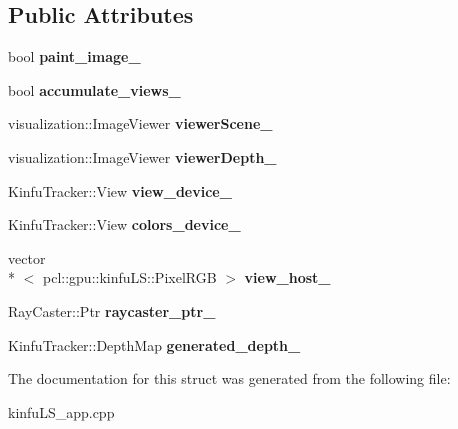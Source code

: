 \subsection*{Public Attributes}
\begin{DoxyCompactItemize}
\item 
\hypertarget{struct_image_view_a3d4f9ee3d67ace1efcbdb33b34e4b7e8}{bool {\bfseries paint\+\_\+image\+\_\+}}\label{struct_image_view_a3d4f9ee3d67ace1efcbdb33b34e4b7e8}

\item 
\hypertarget{struct_image_view_a381f921f4232aac9e8d5d51580cb4100}{bool {\bfseries accumulate\+\_\+views\+\_\+}}\label{struct_image_view_a381f921f4232aac9e8d5d51580cb4100}

\item 
\hypertarget{struct_image_view_a6f1ddcd6ff914ada3a21dd2735cd5c01}{visualization\+::\+Image\+Viewer {\bfseries viewer\+Scene\+\_\+}}\label{struct_image_view_a6f1ddcd6ff914ada3a21dd2735cd5c01}

\item 
\hypertarget{struct_image_view_a4f96bf1c879677d7e4389e304b9a4783}{visualization\+::\+Image\+Viewer {\bfseries viewer\+Depth\+\_\+}}\label{struct_image_view_a4f96bf1c879677d7e4389e304b9a4783}

\item 
\hypertarget{struct_image_view_a4357cf1bfa868a7a057cab2f464c3935}{Kinfu\+Tracker\+::\+View {\bfseries view\+\_\+device\+\_\+}}\label{struct_image_view_a4357cf1bfa868a7a057cab2f464c3935}

\item 
\hypertarget{struct_image_view_a97efc213c640548a3a80807482c6f79d}{Kinfu\+Tracker\+::\+View {\bfseries colors\+\_\+device\+\_\+}}\label{struct_image_view_a97efc213c640548a3a80807482c6f79d}

\item 
\hypertarget{struct_image_view_abff4f8ee5f883f26a9fd50a8fa7edcc8}{vector\\*
$<$ pcl\+::gpu\+::kinfu\+L\+S\+::\+Pixel\+R\+G\+B $>$ {\bfseries view\+\_\+host\+\_\+}}\label{struct_image_view_abff4f8ee5f883f26a9fd50a8fa7edcc8}

\item 
\hypertarget{struct_image_view_acc7f92b88be07d02a22330a6b70a3cf0}{Ray\+Caster\+::\+Ptr {\bfseries raycaster\+\_\+ptr\+\_\+}}\label{struct_image_view_acc7f92b88be07d02a22330a6b70a3cf0}

\item 
\hypertarget{struct_image_view_a7862bb641af08e7e4280c49b4fda87a6}{Kinfu\+Tracker\+::\+Depth\+Map {\bfseries generated\+\_\+depth\+\_\+}}\label{struct_image_view_a7862bb641af08e7e4280c49b4fda87a6}

\end{DoxyCompactItemize}


The documentation for this struct was generated from the following file\+:\begin{DoxyCompactItemize}
\item 
kinfu\+L\+S\+\_\+app.\+cpp\end{DoxyCompactItemize}
